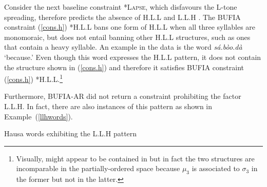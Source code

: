 Consider the next baseline constraint \textsc{*Lapse}, which disfavours
the L-tone spreading, therefore predicts the absence of H.L.L and L.L.H 
\citep{zoll2003optimal}. The BUFIA constraint
(\ref{cons.h}) *H.L.L bans one form of H.L.L when all three syllables
are monomoraic, but does not entail banning other H.L.L structures, 
such as ones that contain a heavy syllable. An
example in the data is the word \textit{sá.bòo.dà} `because.' Even
though this word expresses the H.L.L pattern, it does not contain the
structure shown in (\ref{cons.h}) and therefore it satisfies BUFIA
constraint (\ref{cons.h}) *H.L.L.\footnote{Visually, 
	might appear to be contained in
	but in fact the two structures are incomparable in the partially-ordered
	space because \(\mu_3\) is associated to \(\sigma_3\) in the former
	but not in the latter.}

Furthermore, BUFIA-AR did not return a constraint prohibiting the
factor L.L.H. In fact, there are also instances of this pattern as
shown in Example~(\ref{llhwords}). 

\ex Hausa words exhibiting the L.L.H pattern
\label{llhwords}

